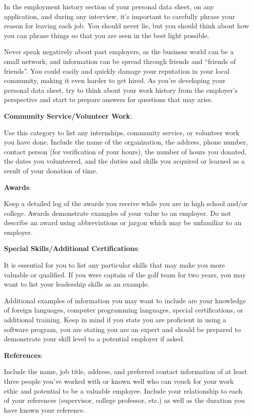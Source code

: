 In the employment history section of your personal data sheet, on any application, and during any interview, it's important to carefully phrase your reason for leaving each job. You should never lie, but you should think about how you can phrase things so that you are seen in the best light possible.

Never speak negatively about past employers, as the business world can be a small network, and information can be spread through friends and ``friends of friends''. You could easily and quickly damage your reputation in your local community, making it even harder to get hired. As you're developing your personal data sheet, try to think about your work history from the employer's perspective and start to prepare answers for questions that may arise.

\textbf{Community Service/Volunteer Work}: 

Use this category to list any internships, community service, or volunteer work you have done. Include the name of the organization, the address, phone number, contact person (for verification of your hours), the number of hours you donated, the dates you volunteered, and the duties and skills you acquired or learned as a result of your donation of time.

\textbf{Awards}:

Keep a detailed log of the awards you receive while you are in high school and/or college. Awards demonstrate examples of your value to an employer. Do not describe an award using abbreviations or jargon which may be unfamiliar to an employer.

\textbf{Special Skills/Additional Certifications}: 

It is essential for you to list any particular skills that may make you more valuable or qualified. If you were captain of the golf team for two years, you may want to list your leadership skills as an example.

Additional examples of information you may want to include are your knowledge of foreign languages, computer programming languages, special certifications, or additional training. Keep in mind if you state you are proficient in using a software program, you are stating you are an expert and should be prepared to demonstrate your skill level to a potential employer if asked.

\textbf{References}: 

Include the name, job title, address, and preferred contact information of at least three people you've worked with or known well who can vouch for your work ethic and potential to be a valuable employee. Include your relationship to each of your references (supervisor, college professor, etc.) as well as the duration you have known your reference.

